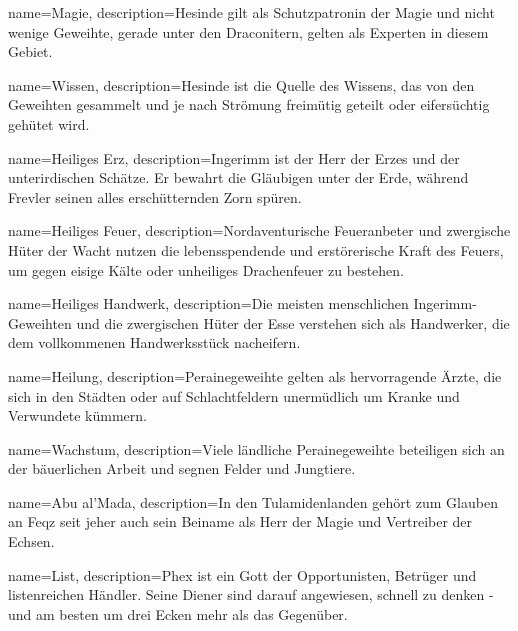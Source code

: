 {
    name={Magie},
    description={Hesinde gilt als Schutzpatronin der Magie und nicht wenige Geweihte, gerade unter den Draconitern, gelten als Experten in diesem Gebiet.}
}


{
    name={Wissen},
    description={Hesinde ist die Quelle des Wissens, das von den Geweihten gesammelt und je nach Strömung freimütig geteilt oder eifersüchtig gehütet wird. }
}


{
    name={Heiliges Erz},
    description={Ingerimm ist der Herr der Erzes und der unterirdischen Schätze. Er bewahrt die Gläubigen unter der Erde, während Frevler seinen alles erschütternden Zorn spüren. }
}


{
    name={Heiliges Feuer},
    description={Nordaventurische Feueranbeter und zwergische Hüter der Wacht nutzen die lebensspendende und erstörerische Kraft des Feuers, um gegen eisige Kälte oder unheiliges Drachenfeuer zu bestehen.}
}


{
    name={Heiliges Handwerk},
    description={Die meisten menschlichen Ingerimm-Geweihten und die zwergischen Hüter der Esse verstehen sich als Handwerker, die dem vollkommenen Handwerksstück nacheifern. }
}


{
    name={Heilung},
    description={Perainegeweihte gelten als hervorragende Ärzte, die sich in den Städten oder auf Schlachtfeldern unermüdlich um Kranke und Verwundete kümmern. }
}


{
    name={Wachstum},
    description={Viele ländliche Perainegeweihte beteiligen sich an der bäuerlichen Arbeit und segnen Felder und Jungtiere. }
}


{
    name={Abu al'Mada},
    description={In den Tulamidenlanden gehört zum Glauben an Feqz seit jeher auch sein Beiname als Herr der Magie und Vertreiber der Echsen.}
}


{
    name={List},
    description={Phex ist ein Gott der Opportunisten, Betrüger und listenreichen Händler. Seine Diener sind darauf angewiesen, schnell zu denken - und am besten um drei Ecken mehr als das Gegenüber.}
}


